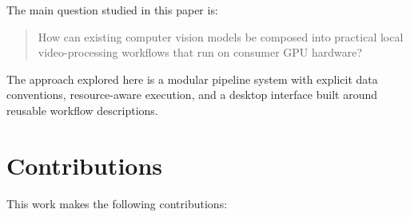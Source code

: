 \documentclass[11pt,a4paper]{article}
\begin{document}
The main question studied in this paper is:

\begin{quote}
How can existing computer vision models be composed into practical local video-processing workflows that run on consumer GPU hardware?
\end{quote}

The approach explored here is a modular pipeline system with explicit data conventions, resource-aware execution, and a desktop interface built around reusable workflow descriptions.

\section{Contributions}

This work makes the following contributions:
\end{document}
